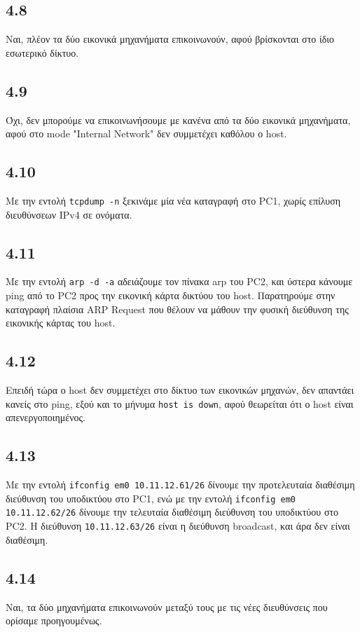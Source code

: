 \documentclass[a4paper, 12pt]{article}
\begin{document}
	\subsection*{4.8} 
		Ναι, πλέον τα δύο εικονικά μηχανήματα επικοινωνούν, αφού βρίσκονται στο ίδιο εσωτερικό δίκτυο.

	\subsection*{4.9} 
		Όχι, δεν μπορούμε να επικοινωνήσουμε με κανένα από τα δύο εικονικά μηχανήματα, αφού στο mode "Internal Network" δεν συμμετέχει καθόλου ο host.

	\subsection*{4.10} 
		Με την εντολή \verb|tcpdump -n| ξεκινάμε μία νέα καταγραφή στο PC1, χωρίς επίλυση διευθύνσεων IPv4 σε ονόματα.

	\subsection*{4.11} 
		Με την εντολή \verb|arp -d -a| αδειάζουμε τον πίνακα arp του PC2, και ύστερα κάνουμε ping από το PC2 προς την εικονική κάρτα δικτύου του host. Παρατηρούμε στην καταγραφή πλαίσια ARP Request που θέλουν να μάθουν την φυσική διεύθυνση της εικονικής κάρτας του host.

	\subsection*{4.12} 
		Επειδή τώρα ο host δεν συμμετέχει στο δίκτυο των εικονικών μηχανών, δεν απαντάει κανείς στο ping, εξού και το μήνυμα \verb|host is down|, αφού θεωρείται ότι ο host είναι απενεργοποιημένος.

	\subsection*{4.13} 
		Με την εντολή \verb|ifconfig em0 10.11.12.61/26| δίνουμε την προτελευταία διαθέσιμη διεύθυνση του υποδικτύου στο PC1, ενώ με την εντολή \verb|ifconfig em0 10.11.12.62/26| δίνουμε την τελευταία διαθέσιμη διεύθυνση του υποδικτύου στο PC2. Η διεύθυνση \verb|10.11.12.63/26| είναι η διεύθυνση broadcast, και άρα δεν είναι διαθέσιμη.

	\subsection*{4.14} 
		Ναι, τα δύο μηχανήματα επικοινωνούν μεταξύ τους με τις νέες διευθύνσεις που ορίσαμε προηγουμένως.
		
\end{document}
